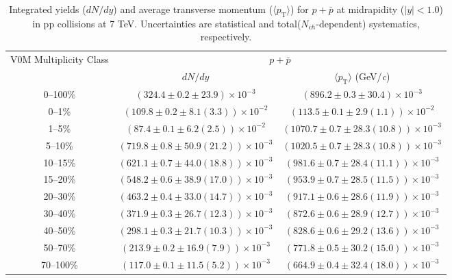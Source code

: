 \begin{table}
\caption{Integrated yields ($dN/dy$) and average transverse momentum ($\langle p_{\mathrm{T}} \rangle$) for $p + \bar{p}$ at midrapidity ($|y|<1.0$) in pp collisions at 7 TeV. Uncertainties are statistical and total($N_{ch}$-dependent) systematics, respectively.}
\label{tab:YieldMeanProtonSum_}
\begin{center}
\begin{tabular}{ c | c c }
\hline
\multirow{2}{*}{V0M Multiplicity Class} & \multicolumn{2}{c}{$p + \bar{p}$} \\ 
& $dN/dy$ & $\langle p_{\mathrm{T}} \rangle$ (GeV/\textit{c})\\ 
\hline
0--100\% & $(324.4\pm0.2\pm23.9)\times10^{-3}$ & $(896.2\pm0.3\pm30.4)\times10^{-3}$ \\ 
0--1\% & $(109.8\pm0.2\pm8.1(3.3))\times10^{-2}$ & $(113.5\pm0.1\pm2.9(1.1))\times10^{-2}$ \\ 
1--5\% & $(87.4\pm0.1\pm6.2(2.5))\times10^{-2}$ & $(1070.7\pm0.7\pm28.3(10.8))\times10^{-3}$ \\ 
5--10\% & $(719.8\pm0.8\pm50.9(21.2))\times10^{-3}$ & $(1020.5\pm0.7\pm28.3(10.8))\times10^{-3}$ \\ 
10--15\% & $(621.1\pm0.7\pm44.0(18.8))\times10^{-3}$ & $(981.6\pm0.7\pm28.4(11.1))\times10^{-3}$ \\ 
15--20\% & $(548.2\pm0.6\pm38.9(17.0))\times10^{-3}$ & $(953.9\pm0.7\pm28.5(11.5))\times10^{-3}$ \\ 
20--30\% & $(463.2\pm0.4\pm33.0(14.7))\times10^{-3}$ & $(917.1\pm0.6\pm28.6(11.9))\times10^{-3}$ \\ 
30--40\% & $(371.9\pm0.3\pm26.7(12.3))\times10^{-3}$ & $(872.6\pm0.6\pm28.9(12.7))\times10^{-3}$ \\ 
40--50\% & $(298.1\pm0.3\pm21.7(10.3))\times10^{-3}$ & $(828.6\pm0.6\pm29.2(13.6))\times10^{-3}$ \\ 
50--70\% & $(213.9\pm0.2\pm16.9(7.9))\times10^{-3}$ & $(771.8\pm0.5\pm30.2(15.0))\times10^{-3}$ \\ 
70--100\% & $(117.0\pm0.1\pm11.5(5.2))\times10^{-3}$ & $(664.9\pm0.4\pm32.4(18.0))\times10^{-3}$ \\ 
\hline
\end{tabular}
\end{center}
\end{table}
 
